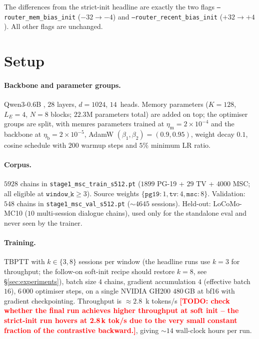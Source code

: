 \documentclass{article}
\newcommand{\todo}[1]{\textcolor{red}{\textbf{[TODO: #1]}}}
\begin{document}
\noindent The differences from the strict-init headline are exactly
the two flags \texttt{--router\_mem\_bias\_init} ($-32 \to -4$) and
\texttt{--router\_recent\_bias\_init} ($+32 \to +4$). All other
flags are unchanged.

\section{Setup}
\label{sec:setup}

\paragraph{Backbone and parameter groups.} Qwen3-0.6B
\cite{qwen3}, $28$ layers, $d{=}1024$, $14$~heads. Memory parameters
($K{=}128$, $L_E{=}4$, $N{=}8$ blocks; $22.3$M parameters total)
are added on top; the optimiser groups are split, with memres
parameters trained at $\eta_{\text{m}}{=}2\!\times\!10^{-4}$ and the
backbone at $\eta_{\text{b}}{=}2\!\times\!10^{-5}$, AdamW
$(\beta_1, \beta_2){=}(0.9, 0.95)$, weight decay $0.1$, cosine
schedule with $200$ warmup steps and $5\%$ minimum LR ratio.

\paragraph{Corpus.} $5928$ chains in
\texttt{stage1\_msc\_train\_s512.pt} ($1899$ PG-19 + $29$ TV +
$4000$ MSC; all eligible at $\texttt{window\_k}\!\ge\!3$). Source
weights $\{\texttt{pg19}{:}1, \texttt{tv}{:}4, \texttt{msc}{:}8\}$.
Validation: $548$ chains in \texttt{stage1\_msc\_val\_s512.pt}
($\sim 4645$ sessions). Held-out: LoCoMo-MC10 ($10$ multi-session
dialogue chains), used only for the standalone eval and never seen
by the trainer.

\paragraph{Training.} TBPTT with $k\!\in\!\{3,8\}$ sessions per
window (the headline runs use $k{=}3$ for throughput; the
follow-on soft-init recipe should restore $k{=}8$, see
\S\ref{sec:experiments}), batch size $4$ chains, gradient
accumulation $4$ (effective batch $16$), $6\,000$ optimiser steps,
on a single NVIDIA GH200 $480$\,GB at bf16 with gradient
checkpointing. Throughput is $\approx\! 2.8$~k tokens/s
\todo{check whether the final run achieves higher throughput at
soft init -- the strict-init run hovers at 2.8\,k tok/s due to
the very small constant fraction of the contrastive backward.},
giving $\sim 14$ wall-clock hours per run.
\end{document}
